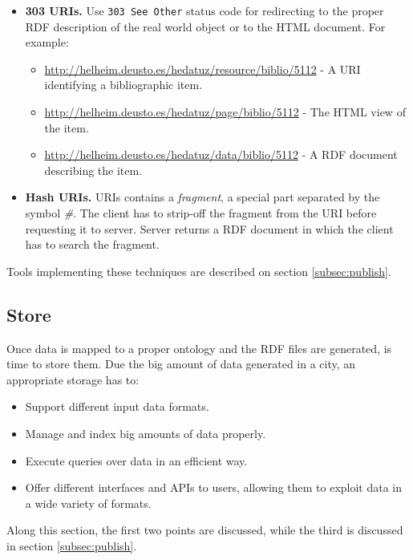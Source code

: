 \begin{itemize}
    \item \textbf{303 URIs.} Use \texttt{303 See Other} status code for redirecting to the proper RDF description of the real world object or to the HTML document. For example:
    \begin{itemize}
        \item \url{http://helheim.deusto.es/hedatuz/resource/biblio/5112} - A URI identifying a bibliographic item.
        \item \url{http://helheim.deusto.es/hedatuz/page/biblio/5112} - The HTML view of the item.
        \item \url{http://helheim.deusto.es/hedatuz/data/biblio/5112} - A RDF document describing the item.
    \end{itemize}

    \item \textbf{Hash URIs.} URIs contains a \textit{fragment}, a special part separated by the symbol \textit{\#}. The client has to strip-off the fragment from the URI before requesting it to server. Server returns a RDF document in which the client has to search the fragment.
\end{itemize}

Tools implementing these techniques are described on section \ref{subsec:publish}.


\subsection{Store}\label{subsec:store}

Once data is mapped to a proper ontology and the RDF files are generated, is time to store them. Due the big amount of data generated in a city, an appropriate storage has to:

\begin{itemize}
    \item Support different input data formats.
    \item Manage and index big amounts of data properly.
    \item Execute queries over data in an efficient way.
    \item Offer different interfaces and APIs to users, allowing them to exploit data in a wide variety of formats.
\end{itemize}

Along this section, the first two points are discussed, while the third is discussed in section \ref{subsec:publish}.

